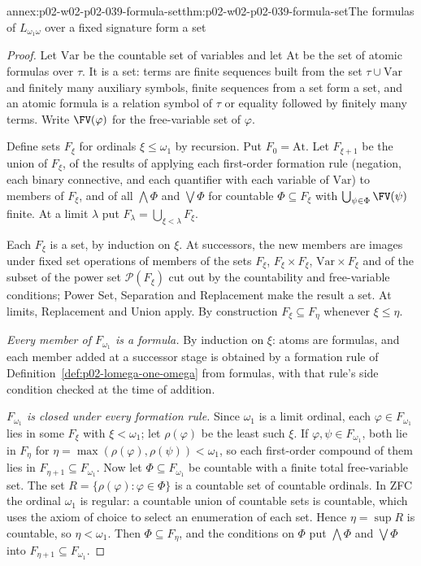 \begin{annexitem}{annex:p02-w02-p02-039-formula-set}{thm:p02-w02-p02-039-formula-set}{The formulas of \(L_{\omega_1\omega}\) over a fixed signature form a set}
\begin{proof}
Let \(\mathrm{Var}\) be the countable set of variables and let
\(\mathrm{At}\) be the set of atomic formulas over \(\tau\).  It is a set:
terms are finite sequences built from the set \(\tau\cup\mathrm{Var}\) and
finitely many auxiliary symbols, finite sequences from a set form a set, and
an atomic formula is a relation symbol of \(\tau\) or equality followed by
finitely many terms.  Write \(\FV(\varphi)\) for the free-variable set of
\(\varphi\).

Define sets \(F_\xi\) for ordinals \(\xi\leq\omega_1\) by recursion.  Put
\(F_0=\mathrm{At}\).  Let \(F_{\xi+1}\) be the union of \(F_\xi\), of the
results of applying each first-order formation rule (negation, each binary
connective, and each quantifier with each variable of \(\mathrm{Var}\)) to
members of \(F_\xi\), and of all \(\bigwedge\Phi\) and \(\bigvee\Phi\) for
countable \(\Phi\subseteq F_\xi\) with \(\bigcup_{\psi\in\Phi}\FV(\psi)\)
finite.  At a limit \(\lambda\) put \(F_\lambda=\bigcup_{\xi<\lambda}F_\xi\).

Each \(F_\xi\) is a set, by induction on \(\xi\).  At successors, the new
members are images under fixed set operations of members of the sets
\(F_\xi\), \(F_\xi\times F_\xi\), \(\mathrm{Var}\times F_\xi\) and of the
subset of the power set \(\mathcal P(F_\xi)\) cut out by the countability
and free-variable conditions; Power Set, Separation and Replacement make
the result a set.  At limits, Replacement and Union apply.  By construction
\(F_\xi\subseteq F_\eta\) whenever \(\xi\leq\eta\).

\emph{Every member of \(F_{\omega_1}\) is a formula.}  By induction on
\(\xi\): atoms are formulas, and each member added at a successor stage is
obtained by a formation rule of Definition~\ref{def:p02-lomega-one-omega}
from formulas, with that rule's side condition checked at the time of
addition.

\emph{\(F_{\omega_1}\) is closed under every formation rule.}  Since
\(\omega_1\) is a limit ordinal, each \(\varphi\in F_{\omega_1}\) lies in
some \(F_\xi\) with \(\xi<\omega_1\); let \(\rho(\varphi)\) be the least
such \(\xi\).  If \(\varphi,\psi\in F_{\omega_1}\), both lie in
\(F_\eta\) for \(\eta=\max(\rho(\varphi),\rho(\psi))<\omega_1\), so each
first-order compound of them lies in \(F_{\eta+1}\subseteq F_{\omega_1}\).
Now let \(\Phi\subseteq F_{\omega_1}\) be countable with a finite total
free-variable set.  The set \(R=\{\rho(\varphi):\varphi\in\Phi\}\) is a
countable set of countable ordinals.  In ZFC the ordinal \(\omega_1\) is
regular: a countable union of countable sets is countable, which uses the
axiom of choice to select an enumeration of each set.  Hence
\(\eta=\sup R\) is countable, so \(\eta<\omega_1\).  Then
\(\Phi\subseteq F_\eta\), and the conditions on \(\Phi\) put
\(\bigwedge\Phi\) and \(\bigvee\Phi\) into \(F_{\eta+1}\subseteq
F_{\omega_1}\).


\end{proof}
\end{annexitem}
